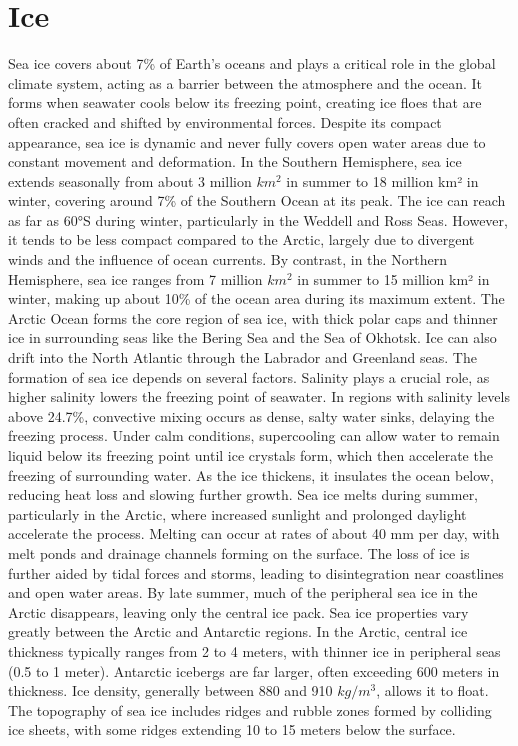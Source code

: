 \section{Ice}
Sea ice covers about 7\% of Earth's oceans and plays a critical role in the global climate system, acting as a barrier between the atmosphere and the ocean. It forms when seawater cools below its freezing point, creating ice floes that are often cracked and shifted by environmental forces. Despite its compact appearance, sea ice is dynamic and never fully covers open water areas due to constant movement and deformation.
In the Southern Hemisphere, sea ice extends seasonally from about 3 million \(km^2\) in summer to 18 million km² in winter, covering around 7\% of the Southern Ocean at its peak. The ice can reach as far as 60°S during winter, particularly in the Weddell and Ross Seas. However, it tends to be less compact compared to the Arctic, largely due to divergent winds and the influence of ocean currents. By contrast, in the Northern Hemisphere, sea ice ranges from 7 million \(km^2\) in summer to 15 million km² in winter, making up about 10\% of the ocean area during its maximum extent. The Arctic Ocean forms the core region of sea ice, with thick polar caps and thinner ice in surrounding seas like the Bering Sea and the Sea of Okhotsk. Ice can also drift into the North Atlantic through the Labrador and Greenland seas.
The formation of sea ice depends on several factors. Salinity plays a crucial role, as higher salinity lowers the freezing point of seawater. In regions with salinity levels above 24.7\%, convective mixing occurs as dense, salty water sinks, delaying the freezing process. Under calm conditions, supercooling can allow water to remain liquid below its freezing point until ice crystals form, which then accelerate the freezing of surrounding water. As the ice thickens, it insulates the ocean below, reducing heat loss and slowing further growth.
Sea ice melts during summer, particularly in the Arctic, where increased sunlight and prolonged daylight accelerate the process. Melting can occur at rates of about 40 mm per day, with melt ponds and drainage channels forming on the surface. The loss of ice is further aided by tidal forces and storms, leading to disintegration near coastlines and open water areas. By late summer, much of the peripheral sea ice in the Arctic disappears, leaving only the central ice pack.
Sea ice properties vary greatly between the Arctic and Antarctic regions. In the Arctic, central ice thickness typically ranges from 2 to 4 meters, with thinner ice in peripheral seas (0.5 to 1 meter). Antarctic icebergs are far larger, often exceeding 600 meters in thickness. Ice density, generally between 880 and 910 \(kg/m^3\), allows it to float. The topography of sea ice includes ridges and rubble zones formed by colliding ice sheets, with some ridges extending 10 to 15 meters below the surface.
